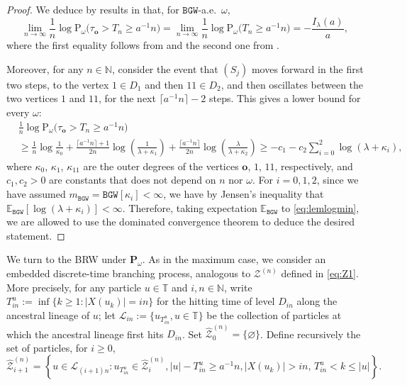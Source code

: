 \documentclass[11 pt]{article}
\theoremstyle{definition}
\numberwithin{equation}{section}
\newcommand{\NN}{\mathbb{N}}
\newcommand{\TT}{\mathbb{T}} %
\newcommand{\rt}{\mathbf{o}} %
\newcommand{\Pws}{\mathrm{P}_{\omega}} %
\begin{document}
\begin{proof}
	We deduce by results in \cite{DGPZ-ld} that, for $\mathtt{BGW}$-a.e.\ $\omega$, 
\begin{equation}\label{eq:lemlogmin}
	\lim_{n\to \infty} \frac{1}{n}\log\Pws\big(\tau_{\rt}> T_{n} \ge a^{-1}  n\big) = 
	\lim_{n\to \infty} \frac{1}{n}\log\Pws\big(T_{n} \ge a^{-1}  n\big) =- \frac{I_{\lambda}(a)}{a},
\end{equation}
where the first equality follows from \cite[the display above (5.3)]{DGPZ-ld} and the second one from \cite[(5.3) and (5.5)]{DGPZ-ld}.

	Moreover, for any $n\in \NN$, consider the event that $(S_j)$ moves forward in the first two steps, to the vertex $1\in D_1$ and then $11\in D_{2}$, and then oscillates between the two vertices $1$ and $11$, for the next $\lceil a^{-1}  n\rceil-2$ steps. This gives a lower bound for every $\omega$: 
\begin{align*}
&\frac{1}{n}\log \Pws\big(\tau_{\rt} >T_{n}
\ge a^{-1}  n\big) 
\\
& \ge  \frac{1}{n}\log \frac{1}{\kappa_0}+ \frac{\lceil a^{-1}  n\rceil+1}{2n}\log \left(\frac{1}{\lambda+\kappa_{1}}\right)+\frac{\lceil a^{-1}  n\rceil}{2n} \log \left(\frac{\lambda}{\lambda+\kappa_{2}}\right)
\ge -c_1 - c_2\sum_{i=0}^2 \log \left(\lambda+\kappa_{i}\right),
\end{align*}
where $\kappa_{0}$, $\kappa_{1}$, $\kappa_{11}$ are the outer degrees of the vertices $\rt$, $1$, $11$, respectively, and  $c_1,c_2>0$ are constants that does not depend on $n$ nor $\omega$.
 For $i=0,1,2$, since we have assumed $m_{\mathtt{BGW}} = \mathbb{\mathtt{BGW}}[\kappa_{i}]<\infty$, we have by Jensen's inequality that $\mathbb{E}_{\mathtt{BGW}}[\log \left(\lambda+\kappa_{i}\right)]<\infty$. 
 Therefore, taking expectation $\mathbb{E}_{\mathtt{BGW}}$ to \eqref{eq:lemlogmin}, we are allowed to use the dominated convergence theorem to deduce the desired statement. 
\end{proof}


We turn to the BRW under $\mathbf{P}_{\omega}$. 
As in the maximum case, we consider an embedded discrete-time branching process,  analogous to $\mathcal{Z}^{(n)}$ defined in \eqref{eq:Z1}. 
More precisely, for any particle $u\in \TT$ and $i,n\in \NN$,  write $T^u_{i n}:=\inf \{k \ge 1:  |X(u_k)|  =  i n\}$ for the hitting time of level $D_{in}$ along the ancestral lineage of $u$; let  $\mathcal{L}_{in}:= \{ u_{T^u_{in}}, u\in\TT \}$ be the collection of particles at which the ancestral lineage first hits  $D_{in}$.
Set $\widehat{\mathcal{Z}}^{(n)}_{0} = \{\varnothing\}$.  
Define recursively the set of particles, for $i\ge 0$, 
\begin{equation*}
	\widehat{\mathcal{Z}}^{(n)}_{i+1} = \left\{u\in \mathcal{L}_{(i+1)n}: u_{T^u_{i n}}\in \widehat{\mathcal{Z}}^{(n)}_i, |u|- T^u_{i n}\ge a^{-1} n,  \vert X(u_k) \vert > in, \, T^u_{in} < k \leq \vert u \vert \right\}.
\end{equation*}
\end{document}
